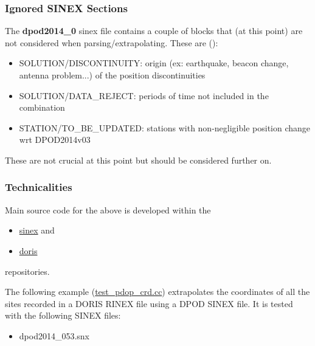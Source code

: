 \subsubsection{Ignored SINEX Sections}
The \textbf{dpod2014\_0} \gls{sinex} file contains a couple of blocks that (at 
this point) are not considered when parsing/extrapolating. These are 
(\cite{Moreaux2020}):
\begin{itemize}
    \item SOLUTION/DISCONTINUITY: origin (ex: earthquake, beacon change, antenna problem...) of
the position discontinuities
    \item SOLUTION/DATA\_REJECT: periods of time not included in the combination
    \item STATION/TO\_BE\_UPDATED: stations with non-negligible position change wrt DPOD2014v03
\end{itemize}

These are not crucial at this point but should be considered further on.

\subsubsection{Technicalities}

Main source code for the above is developed within the 
\begin{itemize}
    \item \href{https://github.com/xanthospap/libsinex}{sinex} and
    \item \href{https://github.com/xanthospap/doris}{doris}
\end{itemize}
repositories.


The following example (\href{https://github.com/xanthospap/doris/blob/main/test/test\_pdop\_crd.cc}{test\_pdop\_crd.cc}) 
extrapolates the coordinates of all the sites recorded in a DORIS RINEX file using a DPOD 
SINEX file. It is tested with the following SINEX files:
\begin{itemize}
    \item dpod2014\_053.snx
\end{itemize}

